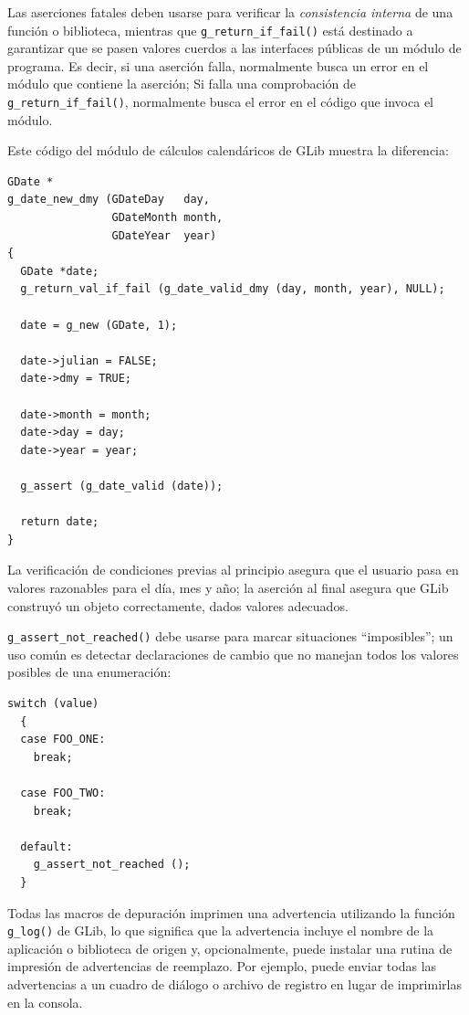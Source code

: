 Las aserciones fatales deben usarse para verificar la \emph{consistencia interna} de una función o biblioteca, mientras que \lstinline{g_return_if_fail()} está destinado a garantizar que se pasen valores cuerdos a las interfaces públicas de un módulo de programa. Es decir, si una aserción falla, normalmente busca un error en el módulo que contiene la aserción; Si falla una comprobación de \lstinline{g_return_if_fail()}, normalmente busca el error en el código que invoca el módulo.

Este código del módulo de cálculos calendáricos de GLib muestra la diferencia:
\begin{lstlisting}[style=GLib/GTK]
GDate *
g_date_new_dmy (GDateDay   day,
                GDateMonth month,
                GDateYear  year)
{
  GDate *date;
  g_return_val_if_fail (g_date_valid_dmy (day, month, year), NULL);

  date = g_new (GDate, 1);

  date->julian = FALSE;
  date->dmy = TRUE;

  date->month = month;
  date->day = day;
  date->year = year;

  g_assert (g_date_valid (date));

  return date;
}
\end{lstlisting}

La verificación de condiciones previas al principio asegura que el usuario pasa en valores razonables para el día, mes y año; la aserción al final asegura que GLib construyó un objeto correctamente, dados valores adecuados.

\lstinline{g_assert_not_reached()} debe usarse para marcar situaciones ``imposibles''; un uso común es detectar declaraciones de cambio que no manejan todos los valores posibles de una enumeración:

\begin{lstlisting}[style=GLib/GTK]
switch (value)
  {
  case FOO_ONE:
    break;

  case FOO_TWO:
    break;

  default:
    g_assert_not_reached ();
  }
\end{lstlisting}

Todas las macros de depuración imprimen una advertencia utilizando la función \lstinline{g_log()} de GLib, lo que significa que la advertencia incluye el nombre de la aplicación o biblioteca de origen y, opcionalmente, puede instalar una rutina de impresión de advertencias de reemplazo. Por ejemplo, puede enviar todas las advertencias a un cuadro de diálogo o archivo de registro en lugar de imprimirlas en la consola.

